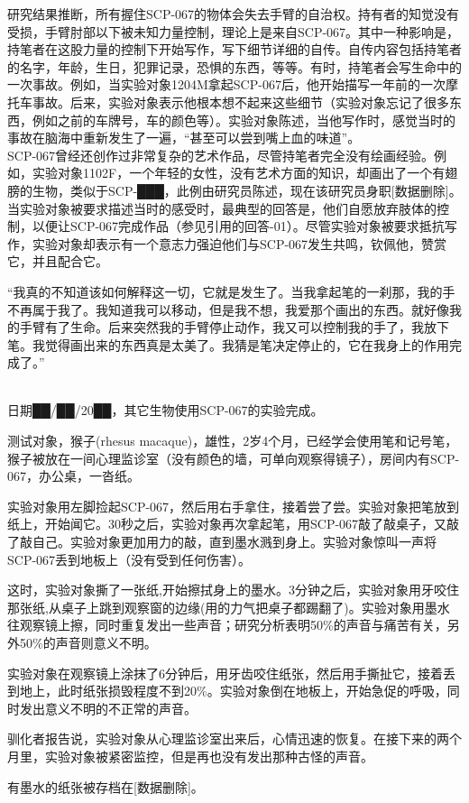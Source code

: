 研究结果推断，所有握住SCP-067的物体会失去手臂的自治权。持有者的知觉没有受损，手臂肘部以下被未知力量控制，理论上是来自SCP-067。其中一种影响是，持笔者在这股力量的控制下开始写作，写下细节详细的自传。自传内容包括持笔者的名字，年龄，生日，犯罪记录，恐惧的东西，等等。有时，持笔者会写生命中的一次事故。例如，当实验对象1204M拿起SCP-067后，他开始描写一年前的一次摩托车事故。后来，实验对象表示他根本想不起来这些细节（实验对象忘记了很多东西，例如之前的车牌号，车的颜色等）。实验对象陈述，当他写作时，感觉当时的事故在脑海中重新发生了一遍，“甚至可以尝到嘴上血的味道”。\\
SCP-067曾经还创作过非常复杂的艺术作品，尽管持笔者完全没有绘画经验。例如，实验对象1102F，一个年轻的女性，没有艺术方面的知识，却画出了一个有翅膀的生物，类似于SCP-███，此例由研究员陈述，现在该研究员身职{[}数据删除]。当实验对象被要求描述当时的感受时，最典型的回答是，他们自愿放弃肢体的控制，以便让SCP-067完成作品（参见引用的回答-01）。尽管实验对象被要求抵抗写作，实验对象却表示有一个意志力强迫他们与SCP-067发生共鸣，钦佩他，赞赏它，并且配合它。

“我真的不知道该如何解释这一切，它就是发生了。当我拿起笔的一刹那，我的手不再属于我了。我知道我可以移动，但是我不想，我爱那个画出的东西。就好像我的手臂有了生命。后来突然我的手臂停止动作，我又可以控制我的手了，我放下笔。我觉得画出来的东西真是太美了。我猜是笔决定停止的，它在我身上的作用完成了。”

\\
日期██\slash ██\slash 20██，其它生物使用SCP-067的实验完成。

测试对象，猴子(rhesus macaque)，雄性，2岁4个月，已经学会使用笔和记号笔，猴子被放在一间心理监诊室（没有颜色的墙，可单向观察得镜子），房间内有SCP-067，办公桌，一沓纸。

实验对象用左脚捡起SCP-067，然后用右手拿住，接着尝了尝。实验对象把笔放到纸上，开始闻它。30秒之后，实验对象再次拿起笔，用SCP-067敲了敲桌子，又敲了敲自己。实验对象更加用力的敲，直到墨水溅到身上。实验对象惊叫一声将SCP-067丢到地板上（没有受到任何伤害）。

这时，实验对象撕了一张纸,开始擦拭身上的墨水。3分钟之后，实验对象用牙咬住那张纸,从桌子上跳到观察窗的边缘(用的力气把桌子都踢翻了)。实验对象用墨水往观察镜上擦，同时重复发出一些声音；研究分析表明50\%的声音与痛苦有关，另外50\%的声音则意义不明。

实验对象在观察镜上涂抹了6分钟后，用牙齿咬住纸张，然后用手撕扯它，接着丢到地上，此时纸张损毁程度不到20\%。实验对象倒在地板上，开始急促的呼吸，同时发出意义不明的不正常的声音。

驯化者报告说，实验对象从心理监诊室出来后，心情迅速的恢复。在接下来的两个月里，实验对象被紧密监控，但是再也没有发出那种古怪的声音。

有墨水的纸张被存档在{[}数据删除]。
